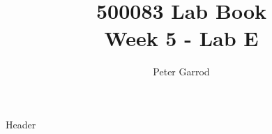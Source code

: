 \documentclass{article}
\title{%
    500083 Lab Book \\
    \large Week 5 - Lab E
    }
\author{Peter Garrod}
\begin{document}
    \maketitle
    \tableofcontents
    \newpage

    {Header}
\end{document}

